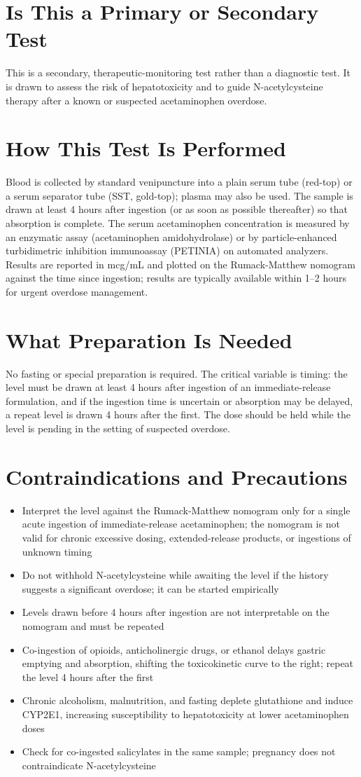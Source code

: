 \section*{Is This a Primary or Secondary Test}
This is a secondary, therapeutic-monitoring test rather than a diagnostic test. It is drawn to assess the risk of hepatotoxicity and to guide N-acetylcysteine therapy after a known or suspected acetaminophen overdose.
\section*{How This Test Is Performed}
Blood is collected by standard venipuncture into a plain serum tube (red-top) or a serum separator tube (SST, gold-top); plasma may also be used. The sample is drawn at least 4 hours after ingestion (or as soon as possible thereafter) so that absorption is complete. The serum acetaminophen concentration is measured by an enzymatic assay (acetaminophen amidohydrolase) or by particle-enhanced turbidimetric inhibition immunoassay (PETINIA) on automated analyzers. Results are reported in mcg/mL and plotted on the Rumack-Matthew nomogram against the time since ingestion; results are typically available within 1--2 hours for urgent overdose management.
\section*{What Preparation Is Needed}
No fasting or special preparation is required. The critical variable is timing: the level must be drawn at least 4 hours after ingestion of an immediate-release formulation, and if the ingestion time is uncertain or absorption may be delayed, a repeat level is drawn 4 hours after the first. The dose should be held while the level is pending in the setting of suspected overdose.
\section*{Contraindications and Precautions}
\begin{itemize}
  \item Interpret the level against the Rumack-Matthew nomogram only for a single acute ingestion of immediate-release acetaminophen; the nomogram is not valid for chronic excessive dosing, extended-release products, or ingestions of unknown timing
  \item Do not withhold N-acetylcysteine while awaiting the level if the history suggests a significant overdose; it can be started empirically
  \item Levels drawn before 4 hours after ingestion are not interpretable on the nomogram and must be repeated
  \item Co-ingestion of opioids, anticholinergic drugs, or ethanol delays gastric emptying and absorption, shifting the toxicokinetic curve to the right; repeat the level 4 hours after the first
  \item Chronic alcoholism, malnutrition, and fasting deplete glutathione and induce CYP2E1, increasing susceptibility to hepatotoxicity at lower acetaminophen doses
  \item Check for co-ingested salicylates in the same sample; pregnancy does not contraindicate N-acetylcysteine
\end{itemize}
